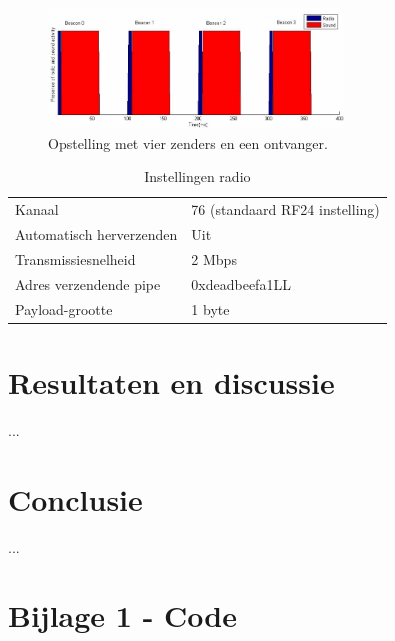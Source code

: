 \documentclass[a4paper,10pt]{article}
\begin{document}
\begin{figure}[ht!]
    \centering
    \includegraphics[width=0.7\textwidth]{tijdsdiagram_handleiding.png}
    \caption{Opstelling met vier zenders en een ontvanger.}
    \label{fig:tijdsdiagram_handleiding}
\end{figure}

\begin{table}[h]
    \begin{minipage}{\textwidth}
        \begin{tabular}{ l l }
            Kanaal                    & 76 (standaard RF24 instelling) \\
            Automatisch herverzenden  & Uit               \\
            Transmissiesnelheid       & 2 Mbps            \\
            Adres verzendende pipe    & 0xdeadbeefa1LL    \\
            Payload-grootte           & 1 byte
        \end{tabular}
        \caption{Instellingen radio}
        \label{table:instellingen}        
    \end{minipage}
\end{table}

\section{Resultaten en discussie}\label{sec:resultaten}
...

\section{Conclusie}\label{sec:conclusie}
...




\newpage
\appendix
\section{Bijlage 1 - Code}
\label{sec:code}

\end{document}
